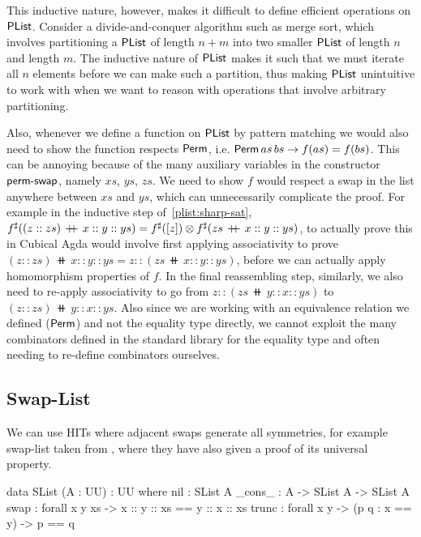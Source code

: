 This inductive nature, however, makes it difficult to define efficient operations on $\operatorname{\mathsf{PList}}$. Consider a
divide-and-conquer algorithm such as merge sort, which involves partitioning a $\operatorname{\mathsf{PList}}$ of length $n+m$ into
two smaller $\operatorname{\mathsf{PList}}$ of length $n$ and length $m$. The inductive nature of $\operatorname{\mathsf{PList}}$ makes it such that
we must iterate all $n$ elements before we can make such a partition, thus making $\operatorname{\mathsf{PList}}$ unintuitive
to work with when we want to reason with operations that involve arbitrary partitioning.

Also, whenever we define a function on $\operatorname{\mathsf{PList}}$ by pattern matching we would also need to show 
the function respects $\operatorname{\mathsf{Perm}}$, i.e. $\operatorname{\mathsf{Perm}} as\,bs \to f(as) = f(bs)$. This can be annoying because
of the many auxiliary variables in the constructor $\operatorname{\mathsf{perm-swap}}$, namely $xs$, $ys$, $zs$.
We need to show $f$ would respect a swap in the list anywhere between $xs$ and $ys$, which can 
unnecessarily complicate the proof. For example in the inductive step of~\ref{plist:sharp-sat},
${f}^{\sharp}((z :: zs)\,\mathbin{+\kern -0.4em+}\,x :: y :: ys) = {f}^{\sharp}([ z ]) \otimes {f}^{\sharp}(zs\,\mathbin{+\kern -0.4em+}\,x :: y :: ys)$,
to actually prove this in Cubical Agda would involve first applying associativity to prove
$(z :: zs)\,\doubleplus\,x :: y :: ys = z :: (zs\,\doubleplus\,x :: y :: ys)$, before we can actually
apply homomorphism properties of $f$. In the final reassembling step, similarly,
we also need to re-apply associativity to go from $z :: (zs\,\doubleplus\,y :: x :: ys)$
to $(z :: zs)\,\doubleplus\,y :: x :: ys$. Also since we are working with an equivalence relation we
defined ($\operatorname{\mathsf{Perm}}$) and not the equality type directly, we cannot exploit the many combinators defined
in the standard library for the equality type and often needing to re-define combinators ourselves.

\subsection{Swap-List}\label{cmon:slist}
We can use HITs where adjacent swaps generate all symmetries,
for example swap-list taken from \cite{choudhuryFreeCommutativeMonoids2023}, where they have
also given a proof of its universal property.

\begin{code}
data SList (A : UU) : UU where
  nil : SList A
  _cons_ : A -> SList A -> SList A
  swap : forall x y xs -> x :: y :: xs == y :: x :: xs 
  trunc : forall x y -> (p q : x == y) -> p == q
\end{code}
\vspace{1em}

